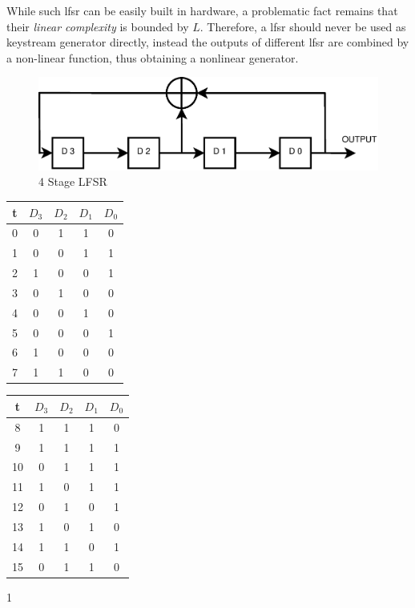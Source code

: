 While such \gls{lfsr} can be easily built in hardware, a problematic fact remains that their \textit{linear complexity} is bounded by $L$. Therefore, a \gls{lfsr}
should never be used as keystream generator directly, instead the outputs of different \gls{lfsr} are combined by a non-linear function, thus obtaining a
nonlinear generator.

\begin{figure}
    \centering
    \includegraphics[width=1\textwidth]{figures/LSFR}
    \caption{4 Stage LFSR}
    \label{fig:lsfr}
\end{figure}

\begin{center}
\begin{minipage}{0.45\textwidth}
\begin{tabular}{ c | c | c | c | c }
 \label{table:lfsr}
  t & $D_3$ & $D_2$ & $D_1$ & $D_0$ \\ \hline
  0 & 0 & 1 & 1 & 0 \\
  1 & 0& 0& 1& 1\\
  2 & 1&0 &0 &1 \\
  3 & 0& 1& 0& 0\\
  4 & 0&0 &1 &0 \\
  5 & 0&0 &0 &1 \\
  6 & 1&0 &0 &0 \\
  7 & 1&1 &0 &0 \\
  \end{tabular}
\end{minipage}\hfill
\begin{minipage}{0.45\textwidth} 
\begin{tabular}{ c | c | c | c | c }
  t & $D_3$ & $D_2$ & $D_1$ & $D_0$ \\ \hline
  8  & 1& 1& 1& 0\\
  9  & 1& 1& 1& 1\\
  10 & 0& 1& 1& 1\\
  11 & 1& 0& 1& 1\\
  12 & 0& 1& 0& 1\\
  13 & 1& 0& 1& 0\\
  14 & 1& 1& 0& 1\\
  15 & 0& 1& 1& 0\\
\end{tabular}
\end{minipage}
\end{center}1

